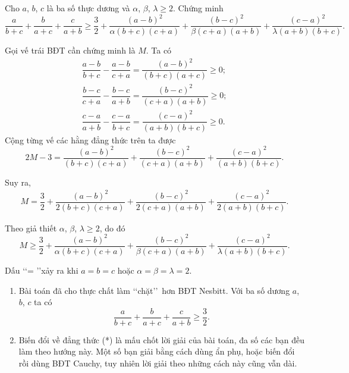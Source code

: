 \begin{bt}%
	Cho $a$, $b$, $c$ là ba số thực dương và $\alpha$, $\beta$, $\lambda\geq 2$. Chứng minh $$\dfrac{a}{b+c}+\dfrac{b}{a+c}+\dfrac{c}{a+b}\geq \dfrac{3}{2}+\dfrac{(a-b)^2}{\alpha(b+c)(c+a)}+\dfrac{(b-c)^2}{\beta(c+a)(a+b)}+\dfrac{(c-a)^2}{\lambda(a+b)(b+c)}.$$
	\loigiai
	{ Gọi vế trái BĐT cần chứng minh là $M$. Ta có
		{\allowdisplaybreaks
			\begin{align*}
				\dfrac{a-b}{b+c}-\dfrac{a-b}{c+a}=\dfrac{(a-b)^2}{(b+c)(a+c)}\geq 0;\\
				\dfrac{b-c}{c+a}-\dfrac{b-c}{a+b}=\dfrac{(b-c)^2}{(c+a)(a+b)}\geq 0;\\
				\dfrac{c-a}{a+b}-\dfrac{c-a}{b+c}=\dfrac{(c-a)^2}{(a+b)(b+c)}\geq 0.
		\end{align*}}Cộng từng vế các hằng đẳng thức trên ta được
		$$2M-3=\dfrac{(a-b)^2}{(b+c)(c+a)}+\dfrac{(b-c)^2}{(c+a)(a+b)}+\dfrac{(c-a)^2}{(a+b)(b+c)}.$$
		
		Suy ra, \begin{align*}
			M=\dfrac{3}{2}+\dfrac{(a-b)^2}{2(b+c)(c+a)}+\dfrac{(b-c)^2}{2(c+a)(a+b)}+\dfrac{(c-a)^2}{2(a+b)(b+c)}.\tag{*}
		\end{align*} 
		
		Theo giả thiết $\alpha$, $\beta$, $\lambda\geq 2$, do đó $$M\geq \dfrac{3}{2}+\dfrac{(a-b)^2}{\alpha(b+c)(c+a)}+\dfrac{(b-c)^2}{\beta(c+a)(a+b)}+\dfrac{(c-a)^2}{\lambda(a+b)(b+c)}.$$
		
		Dấu \lq\lq = \rq\rq xảy ra khi $a=b=c$ hoặc $\alpha=\beta=\lambda=2$.
		\begin{nx}\hfill
			\begin{enumerate}[1)]
				\item Bài toán đã cho thực chất làm \lq\lq chặt\rq\rq\, hơn BĐT Nesbitt. Với ba số dương $a$, $b$, $c$ ta có $$\dfrac{a}{b+c}+\dfrac{b}{a+c}+\dfrac{c}{a+b}\geq\dfrac{3}{2}.$$
				\item Biến đổi về đẳng thức (*) là mấu chốt lời giải của bài toán, đa số các bạn đều làm theo hướng này. Một số bạn giải bằng cách dùng ẩn phụ, hoặc biến đổi rồi dùng BĐT Cauchy, tuy nhiên lời giải theo những cách này cũng vẫn dài.
			\end{enumerate}
		\end{nx}
	}
\end{bt}



